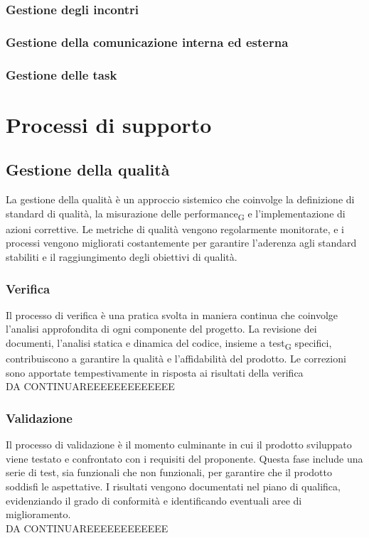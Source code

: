 \documentclass{article}
\begin{document}
\subsubsection{Gestione degli incontri}
\subsubsection{Gestione della comunicazione interna ed esterna}
\subsubsection{Gestione delle task}

\section{Processi di supporto}

\subsection{Gestione della qualità}
La gestione della qualità è un approccio sistemico che coinvolge la definizione di standard di qualità, la misurazione delle performance\textsubscript{G} e l'implementazione di azioni correttive. Le metriche di qualità vengono regolarmente monitorate, e i processi vengono migliorati costantemente per garantire l'aderenza agli standard stabiliti e il raggiungimento degli obiettivi di qualità.

\subsubsection{Verifica}
Il processo di verifica è una pratica svolta in maniera continua che coinvolge l'analisi approfondita di ogni componente del progetto. La revisione dei documenti, l'analisi statica e dinamica del codice, insieme a test\textsubscript{G} specifici, contribuiscono a garantire la qualità e l'affidabilità del prodotto. Le correzioni sono apportate tempestivamente in risposta ai risultati della verifica\\
DA CONTINUAREEEEEEEEEEEEE

\subsubsection{Validazione}
Il processo di validazione è il momento culminante in cui il prodotto sviluppato viene testato e confrontato con i requisiti del proponente. Questa fase include una serie di test, sia funzionali che non funzionali, per garantire che il prodotto soddisfi le aspettative. I risultati vengono documentati nel piano di qualifica, evidenziando il grado di conformità e identificando eventuali aree di miglioramento.\\
DA CONTINUAREEEEEEEEEEEE
\end{document}
